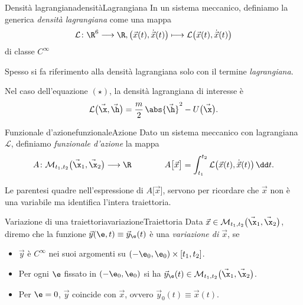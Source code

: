 \begin{defn}{Densità lagrangiana}{densitàLagrangiana}
	In un sistema meccanico, definiamo la generica \emph{densità lagrangiana} come una mappa
	\[
		\mathcal{L}\colon \R^6 \longrightarrow \R, \big(\vec{x}(t),\dot{\vec{x}}(t)\big) \longmapsto \mathcal{L}\big(\vec{x}(t),\dot{\vec{x}}(t)\big)
	\]
	di classe \(C^{\infty}\)
\end{defn}

\begin{notz}
	Spesso si fa riferimento alla densità lagrangiana solo con il termine \emph{lagrangiana}.
\end{notz}

\begin{oss}
	Nel caso dell'equazione \((\star)\), la densità lagrangiana di interesse è
	\[
		\mathcal{L}\big(\vec{\x},\vec{\h}\big) = \frac{m}{2}\,\abs{\vec{\h}}^2-U\big(\vec{\x}\big).
	\]
\end{oss}

\begin{defn}{Funzionale d'azione}{funzionaleAzione}
	Dato un sistema meccanico con lagrangiana \(\mathcal{L}\), definiamo \emph{funzionale d'azione} la mappa
	\[
		A\colon \mathcal{M}_{t_1,t_2}\big(\vec{\x}_1,\vec{\x}_2\big) \longrightarrow \R \qquad \qquad A\big[\vec{x}\big] = \int_{t_1}^{t_2} \mathcal{L}\big(\vec{x}(t),\dot{\vec{x}}(t)\big)\,\dd t.
	\]
\end{defn}

\begin{notz}
	Le parentesi quadre nell'espressione di \(A\big[\vec{x}\big]\), servono per ricordare che \(\vec{x}\) non è una variabile ma identifica l'intera traiettoria.
\end{notz}

\begin{defn}{Variazione di una traiettoria}{variazioneTraiettoria}
	Data \(\vec{x}\in \mathcal{M}_{t_1,t_2}\big(\vec{\x}_1,\vec{\x}_2\big)\), diremo che la funzione \(\vec{y}(\e,t)\equiv \vec{y}_\e(t)\) è una \emph{variazione di \(\vec{x}\)}, se
	\begin{itemize}
		\item \(\vec{y}\) è \(C^{\infty}\) nei suoi argomenti su \((-\e_0,\e_0) \times [t_1,t_2]\).
		\item Per ogni \(\e\) fissato in \((-\e_0,\e_0)\) si ha \(\vec{y}_\e(t)\in \mathcal{M}_{t_1,t_2}\big(\vec{\x}_1,\vec{\x}_2\big)\).
		\item Per \(\e=0\), \(\vec{y}\) coincide con \(\vec{x}\), ovvero \(\vec{y}_0(t) \equiv \vec{x}(t)\).
	\end{itemize}
\end{defn}

